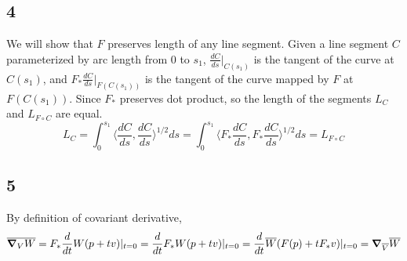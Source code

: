 \documentclass[12pt]{article}
\begin{document}
\subsection*{4}
We will show that $F$ preserves length of any line segment. Given a line segment $C$ parameterized by arc length from $0$ to $s_1$, $\frac{dC}{ds} |_{C(s_1)}$ is the tangent of the curve at $C(s_1)$, and $F_*\frac{dC}{ds}|_{F(C(s_1))}$ is the tangent of the curve mapped by $F$ at $F(C(s_1))$. Since $F_*$ preserves dot product, so the length of the segments $L_C$ and $L_{F \circ C}$ are equal.
$$L_C = \int_0^{s_1} \langle \frac{dC}{ds},  \frac{dC}{ds} \rangle^{1/2} ds = \int_0^{s_1} \langle F_* \frac{dC}{ds},  F_* \frac{dC}{ds} \rangle^{1/2} ds = L_{F \circ C}$$ 


\subsection*{5}
 By definition of covariant derivative, $$\overline{\grad_V W} = F_* \frac{d}{dt} W(p + tv) |_{t=0} =   \frac{d}{dt}F_* W(p + tv) |_{t=0} =  \frac{d}{dt} \overline{W}(F(p) + t F_* v) |_{t=0} = \grad_{\overline{V}} \overline{W}$$
\end{document}

